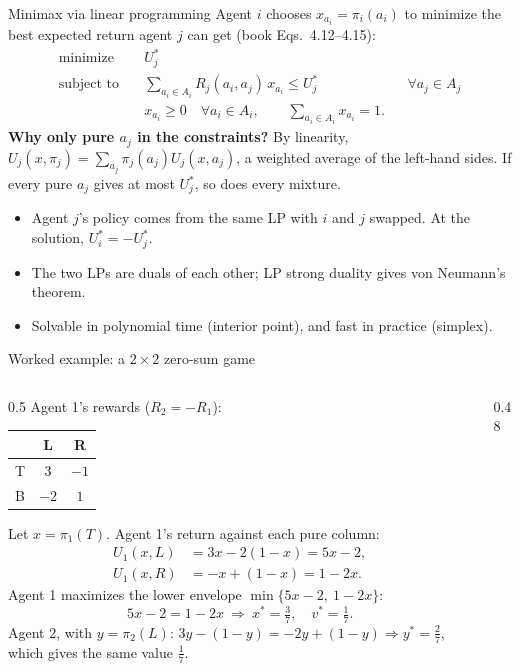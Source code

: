 \documentclass[aspectratio=169,11pt]{beamer}
\begin{document}
\begin{frame}{Minimax via linear programming}
  Agent $i$ chooses $x_{a_i} = \pi_i(a_i)$ to minimize the best expected return agent $j$ can get (book Eqs.\ 4.12--4.15):
  \begin{align*}
    \text{minimize} \quad & U_j^* \\
    \text{subject to} \quad & \sum_{a_i \in A_i} R_j(a_i, a_j)\, x_{a_i} \le U_j^* && \forall a_j \in A_j \\
    & x_{a_i} \ge 0 \quad \forall a_i \in A_i, \qquad \sum_{a_i \in A_i} x_{a_i} = 1 .
  \end{align*}
  \textbf{Why only pure $a_j$ in the constraints?} By linearity, $U_j(x, \pi_j) = \sum_{a_j} \pi_j(a_j) U_j(x, a_j)$, a weighted average of the left-hand sides. If every pure $a_j$ gives at most $U_j^*$, so does every mixture.
  \begin{itemize}
    \item Agent $j$'s policy comes from the same LP with $i$ and $j$ swapped. At the solution, $U_i^* = -U_j^*$.
    \item The two LPs are duals of each other; LP strong duality gives von Neumann's theorem.
    \item Solvable in polynomial time (interior point), and fast in practice (simplex).
  \end{itemize}
\end{frame}

\begin{frame}{Worked example: a $2 \times 2$ zero-sum game}
  \begin{columns}[c]
    \begin{column}{0.5\textwidth}
      \small
      Agent 1's rewards ($R_2 = -R_1$):
      \begin{center}
        \begin{tabular}{c|cc}
          & L & R \\ \hline
          T & $3$ & $-1$ \\
          B & $-2$ & $1$
        \end{tabular}
      \end{center}
      Let $x = \pi_1(T)$. Agent 1's return against each pure column:
      \begin{align*}
        U_1(x, L) &= 3x - 2(1-x) = 5x - 2, \\
        U_1(x, R) &= -x + (1-x) = 1 - 2x .
      \end{align*}
      Agent 1 maximizes the lower envelope $\min\{5x - 2,\ 1 - 2x\}$:
      \[
        5x - 2 = 1 - 2x \ \Rightarrow\ x^* = \tfrac37, \quad v^* = \tfrac17 .
      \]
      Agent 2, with $y = \pi_2(L)$: $3y - (1-y) = -2y + (1-y) \Rightarrow y^* = \tfrac27$, which gives the same value $\tfrac17$.
    \end{column}
    \begin{column}{0.48\textwidth}
      \centering
      
    \end{column}
  \end{columns}
\end{frame}
\end{document}
